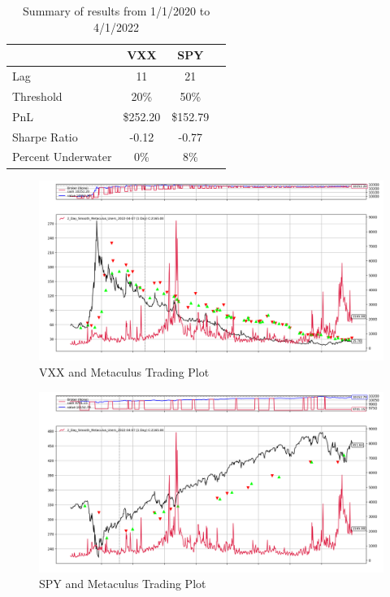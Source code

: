 \documentclass{article}
\begin{document}
\begin{table}[h]   
    \centering
    \begin{tabular}{l||ccc}
        \toprule
        & \textbf{VXX} & \textbf{SPY} & \\
        \midrule
        Lag & 11  & 21\\
        Threshold & 20\%  & 50\%\\
        PnL & \$252.20 & \$152.79 \\
        Sharpe Ratio & -0.12 & -0.77\\
        Percent Underwater & 0\% &  8\%\\
        \bottomrule
    \end{tabular}
    \caption{Summary of results from 1/1/2020 to 4/1/2022}
\end{table}

\begin{figure}[H]
    \centering
    \includegraphics[width=\textwidth]{Metaculus_Lead_VXX.png}
    \caption{VXX and Metaculus Trading Plot}
\end{figure}
            
\begin{figure}[H]
    \centering
    \includegraphics[width=\textwidth]{Metaculus_Lead_SPY.png}
    \caption{SPY and Metaculus Trading Plot}
\end{figure}
\end{document}
